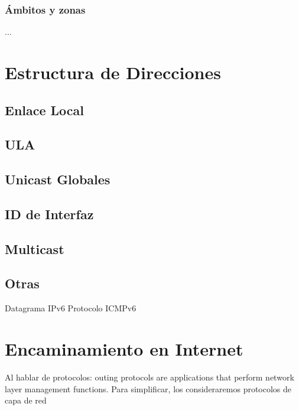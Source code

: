 \subsubsection*{Ámbitos y zonas}...\\

\section*{Estructura de Direcciones}
\subsection*{Enlace Local}
\subsection*{ULA}
\subsection*{Unicast Globales}
\subsection*{ID de Interfaz}
\subsection*{Multicast}
\subsection*{Otras}

Datagrama IPv6
Protocolo ICMPv6

\section{Encaminamiento en Internet}
Al hablar de protocolos: outing protocols are applications that perform network layer management functions. Para simplificar, los consideraremos protocolos de capa de red